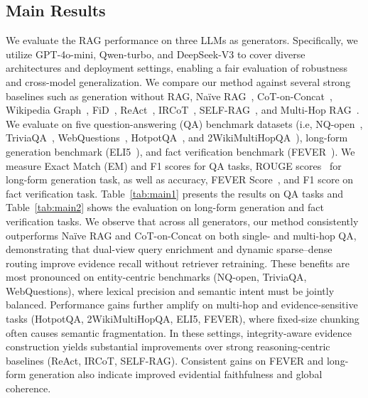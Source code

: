 \subsection{Main Results}
We evaluate the RAG performance on three LLMs as generators.
Specifically, we utilize GPT-4o-mini, Qwen-turbo, and DeepSeek-V3 to cover diverse architectures and deployment settings, enabling a fair evaluation of robustness and cross-model generalization.
We compare our method against several strong baselines such as generation without RAG, Na\"ive RAG~\citep{lewis2020retrieval, gao2023retrieval}, CoT-on-Concat~\cite{wei2022chain}, Wikipedia Graph~\cite{lin2025structured}, FiD~\cite{izacard2021leveraging}, ReAct~\cite{yao2022react}, IRCoT~\cite{trivedi2023interleaving}, SELF-RAG~\cite{asai2024self}, and Multi-Hop RAG~\cite{tang2024multihop}.
We evaluate on five question-answering (QA) benchmark datasets (i.e, NQ-open~\cite{kwiatkowski2019natural}, TriviaQA~\cite{joshi2017triviaqa}, WebQuestions~\cite{berant2013semantic}, HotpotQA~\cite{yang2018hotpotqa}, and 2WikiMultiHopQA~\cite{ho2020constructing}), long-form generation benchmark (ELI5~\cite{fan2019eli5}), and fact verification benchmark (FEVER~\cite{thorne2018fever}).
We measure Exact Match (EM) and F1 scores for QA tasks, ROUGE scores~\cite{lin2004rouge} for long-form generation task, as well as accuracy, FEVER Score~\cite{thorne2018fever}, and F1 score on fact verification task.
Table~\ref{tab:main1} presents the results on QA tasks and Table~\ref{tab:main2} shows the evaluation on long-form generation and fact verification tasks.
We observe that across all generators, our method consistently outperforms Na\"ive RAG and CoT-on-Concat on both single- and multi-hop QA, demonstrating that dual-view query enrichment and dynamic sparse–dense routing improve evidence recall without retriever retraining. 
These benefits are most pronounced on entity-centric benchmarks (NQ-open, TriviaQA, WebQuestions), where lexical precision and semantic intent must be jointly balanced. 
Performance gains further amplify on multi-hop and evidence-sensitive tasks (HotpotQA, 2WikiMultiHopQA, ELI5, FEVER), where fixed-size chunking often causes semantic fragmentation. 
In these settings, integrity-aware evidence construction yields substantial improvements over strong reasoning-centric baselines (ReAct, IRCoT, SELF-RAG). 
Consistent gains on FEVER and long-form generation also indicate improved evidential faithfulness and global coherence. 












